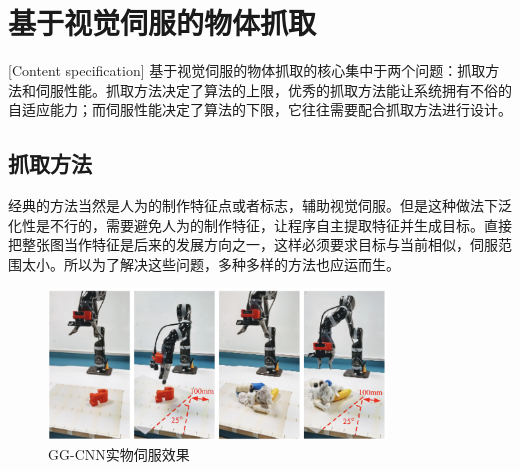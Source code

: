 \documentclass[fontset=fandol,type=bachelor,campus=harbin,bsmainpagenumberline=true]{hithesisbook}
\begin{document}
\section{基于视觉伺服的物体抓取}[Content specification]
基于视觉伺服的物体抓取的核心集中于两个问题：抓取方法和伺服性能。抓取方法决定了算法的上限，优秀的抓取方法能让系统拥有不俗的自适应能力；而伺服性能决定了算法的下限，它往往需要配合抓取方法进行设计。
\subsection{抓取方法}
经典的方法当然是人为的制作特征点或者标志，辅助视觉伺服。但是这种做法下泛化性是不行的，需要避免人为的制作特征，让程序自主提取特征并生成目标。直接把整张图当作特征是后来的发展方向之一，这样必须要求目标与当前相似，伺服范围太小。所以为了解决这些问题，多种多样的方法也应运而生。
\begin{figure}[h]
\centering
\includegraphics[width = 0.8\textwidth]{chapter1/GG-CNN实物伺服效果}
\caption{GG-CNN实物伺服效果}
\label{GG-CNN实物伺服效果}
\end{figure}
\end{document}
